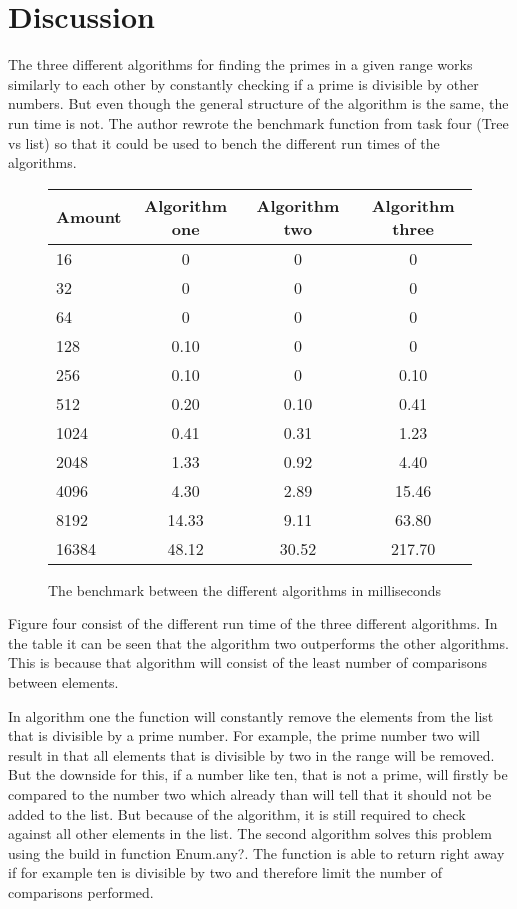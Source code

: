 \documentclass[a4paper,11pt]{article}
\begin{document}
\section*{Discussion}
The three different algorithms for finding the primes in a given range works similarly to each other by constantly checking if a prime is divisible by other numbers. But even though the general structure of the algorithm is the same, the run time is not. The author rewrote the benchmark function from task four (Tree vs list) so that it could be used to bench the different run times of the algorithms.

\begin{figure}[H]
\begin{center}
\begin{tabular}{l|c|c|c}
\textbf{Amount} & \textbf{Algorithm one} & \textbf{Algorithm two} & \textbf{Algorithm three}\\
\hline
  16 & 0 & 0 & 0\\
  32 & 0 & 0 & 0\\
  64 & 0 & 0 & 0\\
  128 & 0.10 & 0 & 0\\
  256 & 0.10 & 0 & 0.10\\
  512 & 0.20 & 0.10 & 0.41\\
  1024 & 0.41 & 0.31 & 1.23\\
  2048 & 1.33 & 0.92 & 4.40\\
  4096 & 4.30 & 2.89 & 15.46\\
  8192 & 14.33 & 9.11 & 63.80\\
  16384 & 48.12 & 30.52 & 217.70\\
\end{tabular}
\caption{The benchmark between the different algorithms in milliseconds}
\label{Figure:4}
\end{center}
\end{figure}

Figure four consist of the different run time of the three different algorithms. In the table it can be seen that the algorithm two outperforms the other algorithms. This is because that algorithm will consist of the least number of comparisons between elements.

In algorithm one the function will constantly remove the elements from the list that is divisible by a prime number. For example, the prime number two will result in that all elements that is divisible by two in the range will be removed. But the downside for this, if a number like ten, that is not a prime, will firstly be compared to the number two which already than will tell that it should not be added to the list. But because of the algorithm, it is still required to check against all other elements in the list. The second algorithm solves this problem using the build in function Enum.any?. The function is able to return right away if for example ten is divisible by two and therefore limit the number of comparisons performed.
\end{document}
